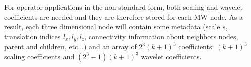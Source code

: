 For operator applications in the non-standard form\cite{Beylkin.10.1002/cpa.3160440202,Frediani.10.1080/00268976.2013.810793}, both scaling and wavelet coefficients are needed and they are therefore stored for each \ac{MW} node. As a result, each three dimensional node will contain some metadata (scale $s$, translation indices $l_x, l_y, l_z$, connectivity information about neighbors nodes, parent and children, etc...) and an array of $2^3 (k+1)^3$ coefficients: $(k+1)^3$ scaling coefficients and $(2^3-1)(k+1)^3$ wavelet coefficients. 